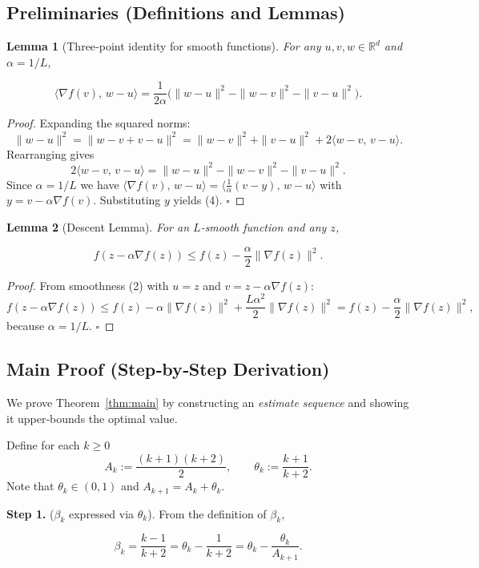 \documentclass{article}
\newtheorem{lemma}{Lemma}
\begin{document}
\subsection*{Preliminaries (Definitions and Lemmas)}
\begin{lemma}[Three‑point identity for smooth functions]\label{lem:three}
For any \(u,v,w\in\mathbb{R}^d\) and \(\alpha=1/L\),

\[
\langle \nabla f(v),\, w-u\rangle
= \frac{1}{2\alpha}\bigl(\|w-u\|^{2} - \|w-v\|^{2} - \|v-u\|^{2}\bigr) .
\tag{4}
\]
\end{lemma}
\begin{proof}
Expanding the squared norms:
\[
\|w-u\|^{2}= \|w-v+v-u\|^{2}
= \|w-v\|^{2}+\|v-u\|^{2}+2\langle w-v,\,v-u\rangle .
\]
Rearranging gives
\[
2\langle w-v,\,v-u\rangle = \|w-u\|^{2} - \|w-v\|^{2} - \|v-u\|^{2}.
\]
Since \(\alpha=1/L\) we have \(\langle \nabla f(v),\, w-u\rangle
= \langle \tfrac{1}{\alpha}(v-y),\, w-u\rangle\) with \(y=v-\alpha\nabla f(v)\). Substituting \(y\) yields (4). \(\square\)
\end{proof}

\begin{lemma}[Descent Lemma]\label{lem:descent}
For an \(L\)-smooth function and any \(z\),

\[
f(z-\alpha\nabla f(z))\le f(z)-\frac{\alpha}{2}\|\nabla f(z)\|^{2}.
\tag{5}
\]
\end{lemma}
\begin{proof}
From smoothness (2) with \(u=z\) and \(v=z-\alpha\nabla f(z)\):
\[
f(z-\alpha\nabla f(z))\le f(z)-\alpha\|\nabla f(z)\|^{2}
+\frac{L\alpha^{2}}{2}\|\nabla f(z)\|^{2}
= f(z)-\frac{\alpha}{2}\|\nabla f(z)\|^{2},
\]
because \(\alpha=1/L\). \(\square\)
\end{proof}

\subsection*{Main Proof (Step‑by‑Step Derivation)}
We prove Theorem~\ref{thm:main} by constructing an \emph{estimate sequence} and showing it upper‑bounds the optimal value.  

Define for each \(k\ge 0\)
\[
A_k := \frac{(k+1)(k+2)}{2},\qquad
\theta_k := \frac{k+1}{k+2}.
\tag{6}
\]
Note that \(\theta_k\in(0,1)\) and \(A_{k+1}=A_k+\theta_k\).

\noindent\textbf{Step 1.} (\(\beta_k\) expressed via \(\theta_k\)).  
From the definition of \(\beta_k\),

\[
\beta_k = \frac{k-1}{k+2}= \theta_k - \frac{1}{k+2}
      = \theta_k - \frac{\theta_k}{A_{k+1}} .
\tag{7}
\]
\end{document}
